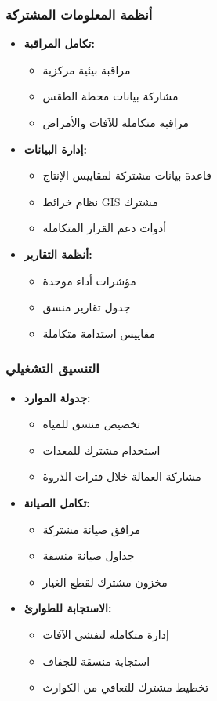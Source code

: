 \subsubsection{أنظمة المعلومات المشتركة}
\begin{itemize}
    \item \textbf{تكامل المراقبة:}
    \begin{itemize}
        \item مراقبة بيئية مركزية
        \item مشاركة بيانات محطة الطقس
        \item مراقبة متكاملة للآفات والأمراض
    \end{itemize}
    \item \textbf{إدارة البيانات:}
    \begin{itemize}
        \item قاعدة بيانات مشتركة لمقاييس الإنتاج
        \item نظام خرائط GIS مشترك
        \item أدوات دعم القرار المتكاملة
    \end{itemize}
    \item \textbf{أنظمة التقارير:}
    \begin{itemize}
        \item مؤشرات أداء موحدة
        \item جدول تقارير منسق
        \item مقاييس استدامة متكاملة
    \end{itemize}
\end{itemize}

\subsubsection{التنسيق التشغيلي}
\begin{itemize}
    \item \textbf{جدولة الموارد:}
    \begin{itemize}
        \item تخصيص منسق للمياه
        \item استخدام مشترك للمعدات
        \item مشاركة العمالة خلال فترات الذروة
    \end{itemize}
    \item \textbf{تكامل الصيانة:}
    \begin{itemize}
        \item مرافق صيانة مشتركة
        \item جداول صيانة منسقة
        \item مخزون مشترك لقطع الغيار
    \end{itemize}
    \item \textbf{الاستجابة للطوارئ:}
    \begin{itemize}
        \item إدارة متكاملة لتفشي الآفات
        \item استجابة منسقة للجفاف
        \item تخطيط مشترك للتعافي من الكوارث
    \end{itemize}
\end{itemize}

